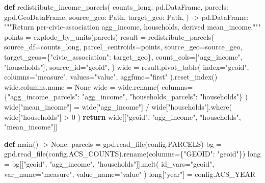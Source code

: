 \documentclass[
  letterpaper,
  DIV=11,
  numbers=noendperiod]{scrreprt}
\newenvironment{Shaded}{\begin{snugshade}}{\end{snugshade}}
\newcommand{\BuiltInTok}[1]{\textcolor[rgb]{0.00,0.23,0.31}{#1}}
\newcommand{\CommentTok}[1]{\textcolor[rgb]{0.37,0.37,0.37}{#1}}
\newcommand{\ControlFlowTok}[1]{\textcolor[rgb]{0.00,0.23,0.31}{\textbf{#1}}}
\newcommand{\DecValTok}[1]{\textcolor[rgb]{0.68,0.00,0.00}{#1}}
\newcommand{\KeywordTok}[1]{\textcolor[rgb]{0.00,0.23,0.31}{\textbf{#1}}}
\newcommand{\NormalTok}[1]{\textcolor[rgb]{0.00,0.23,0.31}{#1}}
\newcommand{\OperatorTok}[1]{\textcolor[rgb]{0.37,0.37,0.37}{#1}}
\newcommand{\StringTok}[1]{\textcolor[rgb]{0.13,0.47,0.30}{#1}}
\newcommand{\VariableTok}[1]{\textcolor[rgb]{0.07,0.07,0.07}{#1}}
\begin{document}
\begin{Shaded}
\begin{Highlighting}[]
\KeywordTok{def}\NormalTok{ redistribute\_income\_parcels(}
\NormalTok{    counts\_long: pd.DataFrame,}
\NormalTok{    parcels: gpd.GeoDataFrame,}
\NormalTok{    source\_geo: Path,}
\NormalTok{    target\_geo: Path,}
\NormalTok{) }\OperatorTok{{-}\textgreater{}}\NormalTok{ pd.DataFrame:}
    \CommentTok{"""Return per{-}civic{-}association agg\_income, households, derived mean\_income."""}
\NormalTok{    points }\OperatorTok{=}\NormalTok{ explode\_by\_units(parcels)}
\NormalTok{    result }\OperatorTok{=}\NormalTok{ redistribute\_parcels(}
\NormalTok{        source\_df}\OperatorTok{=}\NormalTok{counts\_long,}
\NormalTok{        parcel\_centroids}\OperatorTok{=}\NormalTok{points,}
\NormalTok{        source\_geo}\OperatorTok{=}\NormalTok{source\_geo,}
\NormalTok{        target\_geos}\OperatorTok{=}\NormalTok{\{}\StringTok{"civic\_association"}\NormalTok{: target\_geo\},}
\NormalTok{        count\_cols}\OperatorTok{=}\NormalTok{[}\StringTok{"agg\_income"}\NormalTok{, }\StringTok{"households"}\NormalTok{],}
\NormalTok{        source\_id}\OperatorTok{=}\StringTok{"geoid"}\NormalTok{,}
\NormalTok{    )}
\NormalTok{    wide }\OperatorTok{=}\NormalTok{ result.pivot\_table(}
\NormalTok{        index}\OperatorTok{=}\StringTok{"geoid"}\NormalTok{, columns}\OperatorTok{=}\StringTok{"measure"}\NormalTok{, values}\OperatorTok{=}\StringTok{"value"}\NormalTok{, aggfunc}\OperatorTok{=}\StringTok{"first"}
\NormalTok{    ).reset\_index()}
\NormalTok{    wide.columns.name }\OperatorTok{=} \VariableTok{None}
\NormalTok{    wide }\OperatorTok{=}\NormalTok{ wide.rename(}
\NormalTok{        columns}\OperatorTok{=}\NormalTok{\{}\StringTok{"agg\_income\_parcels"}\NormalTok{: }\StringTok{"agg\_income"}\NormalTok{, }\StringTok{"households\_parcels"}\NormalTok{: }\StringTok{"households"}\NormalTok{\}}
\NormalTok{    )}
\NormalTok{    wide[}\StringTok{"mean\_income"}\NormalTok{] }\OperatorTok{=}\NormalTok{ wide[}\StringTok{"agg\_income"}\NormalTok{] }\OperatorTok{/}\NormalTok{ wide[}\StringTok{"households"}\NormalTok{].where(}
\NormalTok{        wide[}\StringTok{"households"}\NormalTok{] }\OperatorTok{\textgreater{}} \DecValTok{0}
\NormalTok{    )}
    \ControlFlowTok{return}\NormalTok{ wide[[}\StringTok{"geoid"}\NormalTok{, }\StringTok{"agg\_income"}\NormalTok{, }\StringTok{"households"}\NormalTok{, }\StringTok{"mean\_income"}\NormalTok{]]}


\KeywordTok{def}\NormalTok{ main() }\OperatorTok{{-}\textgreater{}} \VariableTok{None}\NormalTok{:}
\NormalTok{    parcels }\OperatorTok{=}\NormalTok{ gpd.read\_file(config.PARCELS)}
\NormalTok{    bg }\OperatorTok{=}\NormalTok{ gpd.read\_file(config.ACS\_COUNTS).rename(columns}\OperatorTok{=}\NormalTok{\{}\StringTok{"GEOID"}\NormalTok{: }\StringTok{"geoid"}\NormalTok{\})}
    \BuiltInTok{long} \OperatorTok{=}\NormalTok{ bg[[}\StringTok{"geoid"}\NormalTok{, }\StringTok{"agg\_income"}\NormalTok{, }\StringTok{"households"}\NormalTok{]].melt(}
\NormalTok{        id\_vars}\OperatorTok{=}\StringTok{"geoid"}\NormalTok{, var\_name}\OperatorTok{=}\StringTok{"measure"}\NormalTok{, value\_name}\OperatorTok{=}\StringTok{"value"}
\NormalTok{    )}
    \BuiltInTok{long}\NormalTok{[}\StringTok{"year"}\NormalTok{] }\OperatorTok{=}\NormalTok{ config.ACS\_YEAR}


\end{Highlighting}
\end{Shaded}
\end{document}
